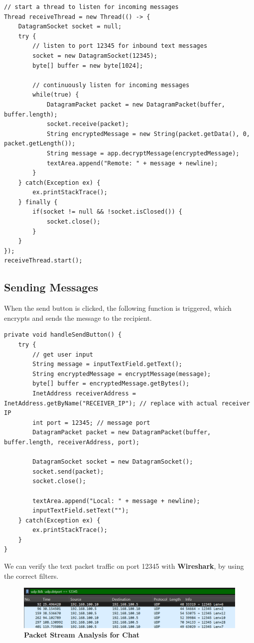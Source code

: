 \documentclass[a4paper,12pt]{article}
\begin{document}
\begin{lstlisting}[caption={\textbf{Receiving Messages}}, label={lst:receive-messages}]
// start a thread to listen for incoming messages
Thread receiveThread = new Thread(() -> {
    DatagramSocket socket = null;
    try {
        // listen to port 12345 for inbound text messages
        socket = new DatagramSocket(12345);
        byte[] buffer = new byte[1024];

        // continuously listen for incoming messages
        while(true) {
            DatagramPacket packet = new DatagramPacket(buffer, buffer.length);
            socket.receive(packet);
            String encryptedMessage = new String(packet.getData(), 0, packet.getLength());
            String message = app.decryptMessage(encryptedMessage);
            textArea.append("Remote: " + message + newline);
        }
    } catch(Exception ex) {
        ex.printStackTrace();
    } finally {
        if(socket != null && !socket.isClosed()) {
            socket.close();
        }
    }
});
receiveThread.start();
\end{lstlisting}

\subsection{Sending Messages}
When the send button is clicked, the following function is triggered, which encrypts and sends the message to the recipient.

\begin{lstlisting}[caption={\textbf{Sending Messages}}, label={lst:send-messages}]
private void handleSendButton() {
    try {
        // get user input
        String message = inputTextField.getText();
        String encryptedMessage = encryptMessage(message);
        byte[] buffer = encryptedMessage.getBytes();
        InetAddress receiverAddress = InetAddress.getByName("RECEIVER_IP"); // replace with actual receiver IP
        int port = 12345; // message port
        DatagramPacket packet = new DatagramPacket(buffer, buffer.length, receiverAddress, port);
        
        DatagramSocket socket = new DatagramSocket();
        socket.send(packet);
        socket.close();
        
        textArea.append("Local: " + message + newline);
        inputTextField.setText("");
    } catch(Exception ex) {
        ex.printStackTrace();
    }
}
\end{lstlisting}

\vspace{0.5cm}
We can verify the text packet traffic on port 12345 with \textbf{Wireshark}, by using the correct filters.
\begin{figure}[H]
    \centering
    \includegraphics[width=1\linewidth]{assets/Chat Stream.png}
    \caption{\textbf{Packet Stream Analysis for Chat}}
    \label{fig:chat-stream}
\end{figure}
\end{document}
